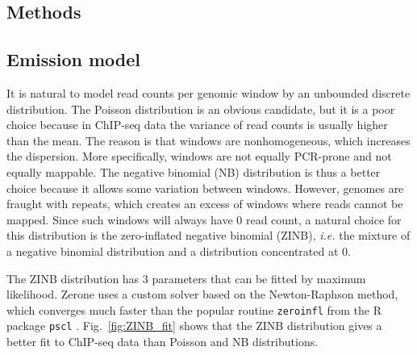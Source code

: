 \documentclass{bioinfo}
\begin{document}
\begin{methods}
\section{Methods}

\subsection{Emission model}
\label{sub:emissions}
It is natural to model read counts per genomic window by an unbounded
discrete distribution. The Poisson distribution is an obvious candidate,
but it is a poor choice because in ChIP-seq data the variance of read
counts is usually higher than the mean. The reason is that windows
are nonhomogeneous, which increases the dispersion. More specifically,
windows
are not equally PCR-prone and not equally mappable. The negative binomial
(NB) distribution is thus a better choice because it allows some variation
between windows. However, genomes are fraught with repeats, which creates
an excess of windows where reads cannot be mapped. Since such windows
will always have 0 read count, a natural choice for this distribution is
the zero-inflated negative binomial (ZINB), \textit{i.e.} the mixture of
a negative binomial distribution and a distribution concentrated at 0.

The ZINB distribution has 3 parameters that can be fitted by maximum
likelihood. Zerone uses a custom solver based on the Newton-Raphson
method, which converges much faster than the popular routine
\texttt{zeroinfl} \citep{psclb} from the R \citep{R} package \texttt{pscl}
\citep{pscla}.
Fig.~\ref{fig:ZINB_fit} shows that the ZINB distribution gives a better
fit to ChIP-seq data than Poisson and NB distributions.


\end{methods}
\end{document}
